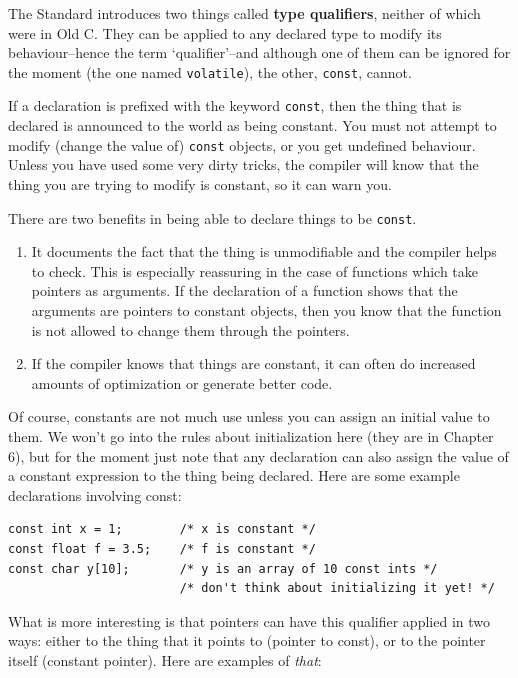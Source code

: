    The Standard introduces two things called \textbf{type qualifiers},
    neither of which were in Old C. They can be applied to any declared type
    to modify its behaviour--hence the term `qualifier'--and
    although one of them can be ignored for the moment (the one named
    \texttt{volatile}), the other, \texttt{const}, cannot.


   If a declaration is prefixed with the keyword \texttt{const}, then
    the thing that is declared is announced to the world as being constant.
    You must not attempt to modify (change the value of) \texttt{const}
    objects, or you get undefined behaviour. Unless you have used some very
    dirty tricks, the compiler will know that the thing you are trying to
    modify is constant, so it can warn you.


   There are two benefits in being able to declare things to be
    \texttt{const}.


   \begin{enumerate}
    \item It documents the fact that the thing is unmodifiable and the
     compiler helps to check. This is especially reassuring in the case
     of functions which take pointers as arguments. If the declaration
     of a function shows that the arguments are pointers to constant
     objects, then you know that the function is not allowed to change
     them through the pointers.

    \item If the compiler knows that things are constant, it can often do
     increased amounts of optimization or generate better code.
   \end{enumerate}

   Of course, constants are not much use unless you can assign an initial
    value to them. We won't go into the rules about initialization here
    (they are in Chapter 6), but for the moment just note that
    any declaration can also assign the value of a constant expression to
    the thing being declared. Here are some example declarations involving
    const:


   \begin{Verbatim}
const int x = 1;        /* x is constant */
const float f = 3.5;    /* f is constant */
const char y[10];       /* y is an array of 10 const ints */
                        /* don't think about initializing it yet! */
\end{Verbatim}

   What is more interesting is that pointers can have this qualifier
    applied in two ways: either to the thing that it points to (pointer to
    const), or to the pointer itself (constant pointer). Here are examples
    of \textit{that}:


